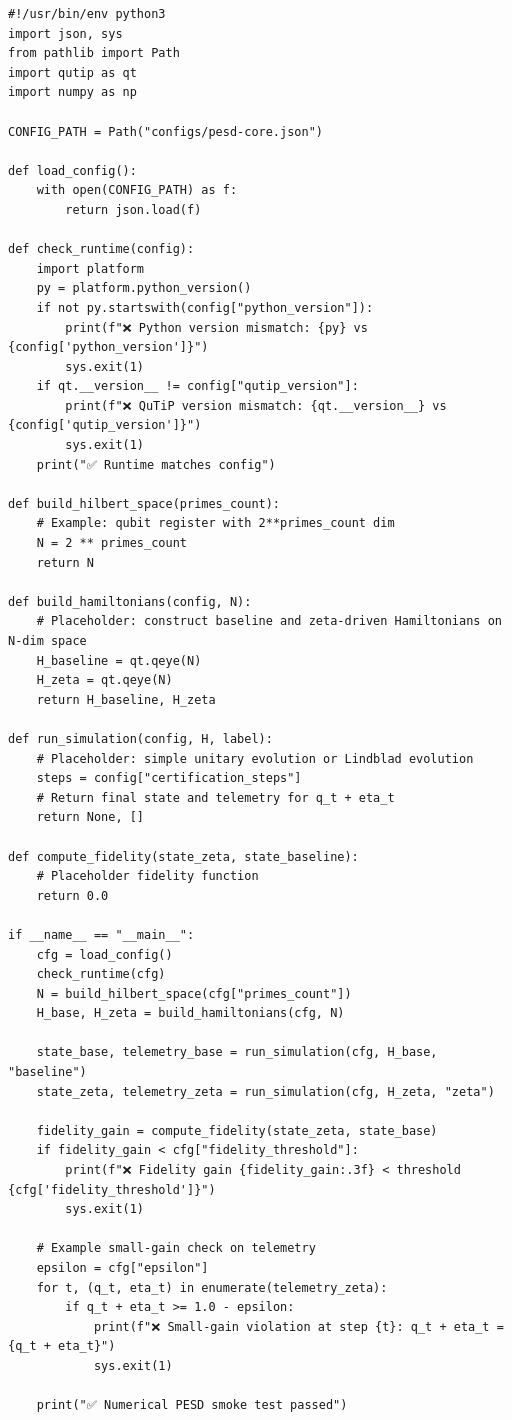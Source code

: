 \documentclass[11pt]{article}
\begin{document}
\begin{verbatim}
#!/usr/bin/env python3
import json, sys
from pathlib import Path
import qutip as qt
import numpy as np

CONFIG_PATH = Path("configs/pesd-core.json")

def load_config():
    with open(CONFIG_PATH) as f:
        return json.load(f)

def check_runtime(config):
    import platform
    py = platform.python_version()
    if not py.startswith(config["python_version"]):
        print(f"❌ Python version mismatch: {py} vs {config['python_version']}")
        sys.exit(1)
    if qt.__version__ != config["qutip_version"]:
        print(f"❌ QuTiP version mismatch: {qt.__version__} vs {config['qutip_version']}")
        sys.exit(1)
    print("✅ Runtime matches config")

def build_hilbert_space(primes_count):
    # Example: qubit register with 2**primes_count dim
    N = 2 ** primes_count
    return N

def build_hamiltonians(config, N):
    # Placeholder: construct baseline and zeta-driven Hamiltonians on N-dim space
    H_baseline = qt.qeye(N)
    H_zeta = qt.qeye(N)
    return H_baseline, H_zeta

def run_simulation(config, H, label):
    # Placeholder: simple unitary evolution or Lindblad evolution
    steps = config["certification_steps"]
    # Return final state and telemetry for q_t + eta_t
    return None, []

def compute_fidelity(state_zeta, state_baseline):
    # Placeholder fidelity function
    return 0.0

if __name__ == "__main__":
    cfg = load_config()
    check_runtime(cfg)
    N = build_hilbert_space(cfg["primes_count"])
    H_base, H_zeta = build_hamiltonians(cfg, N)

    state_base, telemetry_base = run_simulation(cfg, H_base, "baseline")
    state_zeta, telemetry_zeta = run_simulation(cfg, H_zeta, "zeta")

    fidelity_gain = compute_fidelity(state_zeta, state_base)
    if fidelity_gain < cfg["fidelity_threshold"]:
        print(f"❌ Fidelity gain {fidelity_gain:.3f} < threshold {cfg['fidelity_threshold']}")
        sys.exit(1)

    # Example small-gain check on telemetry
    epsilon = cfg["epsilon"]
    for t, (q_t, eta_t) in enumerate(telemetry_zeta):
        if q_t + eta_t >= 1.0 - epsilon:
            print(f"❌ Small-gain violation at step {t}: q_t + eta_t = {q_t + eta_t}")
            sys.exit(1)

    print("✅ Numerical PESD smoke test passed")
\end{verbatim}
\end{document}
